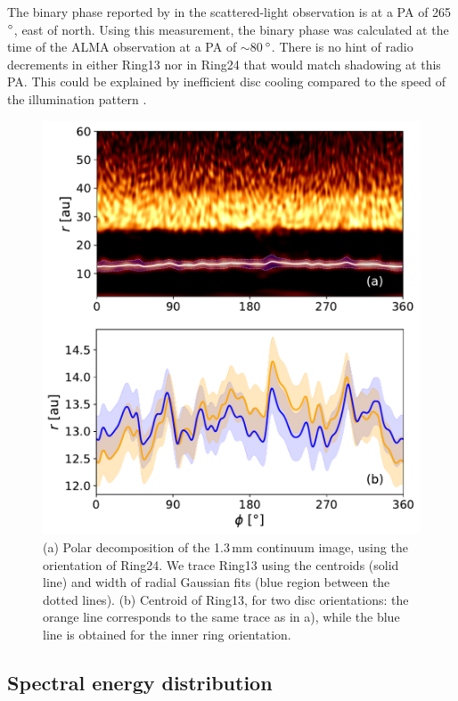 \documentclass[fleqn,usenatbib,useAMS]{mnras}
\begin{document}
The binary phase reported by \citet{dOrazi} in the scattered-light observation is at a PA of 265\,$\hbox{$^\circ$}$, east of north. Using this measurement, the binary phase was calculated at the time of the ALMA observation at a PA of $\sim$80\,$\hbox{$^\circ$}$. There is no hint of radio decrements in either Ring13 nor in Ring24 that would match shadowing at this PA. This could be explained by inefficient disc cooling compared to the speed of the illumination pattern \citep[see ][ for estimates of this cooling timescale]{Casassus2019MNRAS.486L..58C}. 

\begin{figure}
    \includegraphics[width=\columnwidth]{polar_ring_aprox_and_diff_inner.pdf}
    \caption{(a) Polar decomposition of the 1.3\,mm continuum image, using the orientation of Ring24. We trace Ring13 using the centroids (solid line) and width of radial Gaussian fits (blue region between the dotted lines). (b) Centroid of Ring13, for two disc orientations: the orange line corresponds to the same trace as in a), while the blue line is obtained for the inner ring orientation.}
    \label{fig:polarring}
\end{figure}

\subsection{Spectral energy distribution} \label{subsec:SED}
\end{document}
